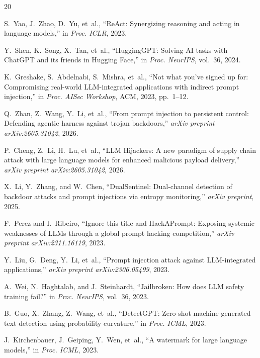\documentclass[conference]{IEEEtran}
\begin{document}

\begin{thebibliography}{20}

S.~Yao, J.~Zhao, D.~Yu, et~al., ``ReAct: Synergizing reasoning and acting in language models,'' in \emph{Proc. ICLR}, 2023.

Y.~Shen, K.~Song, X.~Tan, et~al., ``HuggingGPT: Solving AI tasks with ChatGPT and its friends in Hugging Face,'' in \emph{Proc. NeurIPS}, vol.~36, 2024.

K.~Greshake, S.~Abdelnabi, S.~Mishra, et~al., ``Not what you've signed up for: Compromising real-world LLM-integrated applications with indirect prompt injection,'' in \emph{Proc. AISec Workshop}, ACM, 2023, pp.~1--12.

Q.~Zhan, Z.~Wang, Y.~Li, et~al., ``From prompt injection to persistent control: Defending agentic harness against trojan backdoors,'' \emph{arXiv preprint arXiv:2605.31042}, 2026.

P.~Cheng, Z.~Li, H.~Lu, et~al., ``LLM Hijackers: A new paradigm of supply chain attack with large language models for enhanced malicious payload delivery,'' \emph{arXiv preprint arXiv:2605.31042}, 2026.

X.~Li, Y.~Zhang, and W.~Chen, ``DualSentinel: Dual-channel detection of backdoor attacks and prompt injections via entropy monitoring,'' \emph{arXiv preprint}, 2025.

F.~Perez and I.~Ribeiro, ``Ignore this title and HackAPrompt: Exposing systemic weaknesses of LLMs through a global prompt hacking competition,'' \emph{arXiv preprint arXiv:2311.16119}, 2023.

Y.~Liu, G.~Deng, Y.~Li, et~al., ``Prompt injection attack against LLM-integrated applications,'' \emph{arXiv preprint arXiv:2306.05499}, 2023.

A.~Wei, N.~Haghtalab, and J.~Steinhardt, ``Jailbroken: How does LLM safety training fail?'' in \emph{Proc. NeurIPS}, vol.~36, 2023.

B.~Guo, X.~Zhang, Z.~Wang, et~al., ``DetectGPT: Zero-shot machine-generated text detection using probability curvature,'' in \emph{Proc. ICML}, 2023.

J.~Kirchenbauer, J.~Geiping, Y.~Wen, et~al., ``A watermark for large language models,'' in \emph{Proc. ICML}, 2023.


\end{thebibliography}
\end{document}
